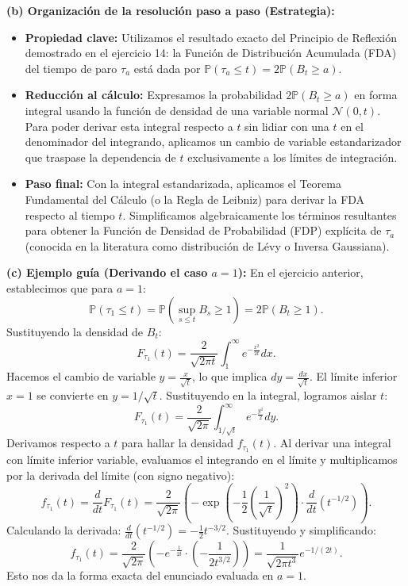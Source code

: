 \documentclass[11pt, letterpaper]{article}
\begin{document}
\begin{solucion}
    \textbf{(b) Organización de la resolución paso a paso (Estrategia):}
    \begin{itemize}
        \item[(i)] \textbf{Propiedad clave:} Utilizamos el resultado exacto del Principio de Reflexión demostrado en el ejercicio 14: la Función de Distribución Acumulada (FDA) del tiempo de paro $\tau_a$ está dada por $\mathbb{P}(\tau_a \le t) = 2\mathbb{P}(B_t \ge a)$.
        \item[(ii)] \textbf{Reducción al cálculo:} Expresamos la probabilidad $2\mathbb{P}(B_t \ge a)$ en forma integral usando la función de densidad de una variable normal $\mathcal{N}(0, t)$. Para poder derivar esta integral respecto a $t$ sin lidiar con una $t$ en el denominador del integrando, aplicamos un cambio de variable estandarizador que traspase la dependencia de $t$ exclusivamente a los límites de integración.
        \item[(iii)] \textbf{Paso final:} Con la integral estandarizada, aplicamos el Teorema Fundamental del Cálculo (o la Regla de Leibniz) para derivar la FDA respecto al tiempo $t$. Simplificamos algebraicamente los términos resultantes para obtener la Función de Densidad de Probabilidad (FDP) explícita de $\tau_a$ (conocida en la literatura como distribución de Lévy o Inversa Gaussiana).
    \end{itemize}

    \vspace{3mm}
    \textbf{(c) Ejemplo guía (Derivando el caso $a = 1$):}
    En el ejercicio anterior, establecimos que para $a=1$:
    \[ \mathbb{P}(\tau_1 \le t) = \mathbb{P}\left(\sup_{s \le t} B_s \ge 1\right) = 2\mathbb{P}(B_t \ge 1). \]
    Sustituyendo la densidad de $B_t$:
    \[ F_{\tau_1}(t) = \frac{2}{\sqrt{2\pi t}} \int_1^\infty e^{-\frac{x^2}{2t}} dx. \]
    Hacemos el cambio de variable $y = \frac{x}{\sqrt{t}}$, lo que implica $dy = \frac{dx}{\sqrt{t}}$. El límite inferior $x=1$ se convierte en $y=1/\sqrt{t}$. 
    Sustituyendo en la integral, logramos aislar $t$:
    \[ F_{\tau_1}(t) = \frac{2}{\sqrt{2\pi}} \int_{1/\sqrt{t}}^\infty e^{-\frac{y^2}{2}} dy. \]
    Derivamos respecto a $t$ para hallar la densidad $f_{\tau_1}(t)$. Al derivar una integral con límite inferior variable, evaluamos el integrando en el límite y multiplicamos por la derivada del límite (con signo negativo):
    \[ f_{\tau_1}(t) = \frac{d}{dt} F_{\tau_1}(t) = \frac{2}{\sqrt{2\pi}} \left( - \exp\left(-\frac{1}{2}\left(\frac{1}{\sqrt{t}}\right)^2\right) \cdot \frac{d}{dt}\left(t^{-1/2}\right) \right). \]
    Calculando la derivada: $\frac{d}{dt}(t^{-1/2}) = -\frac{1}{2}t^{-3/2}$. Sustituyendo y simplificando:
    \[ f_{\tau_1}(t) = \frac{2}{\sqrt{2\pi}} \left( - e^{-\frac{1}{2t}} \cdot \left(-\frac{1}{2t^{3/2}}\right) \right) = \frac{1}{\sqrt{2\pi t^3}} e^{-1/(2t)}. \]
    Esto nos da la forma exacta del enunciado evaluada en $a=1$.


\end{solucion}
\end{document}
